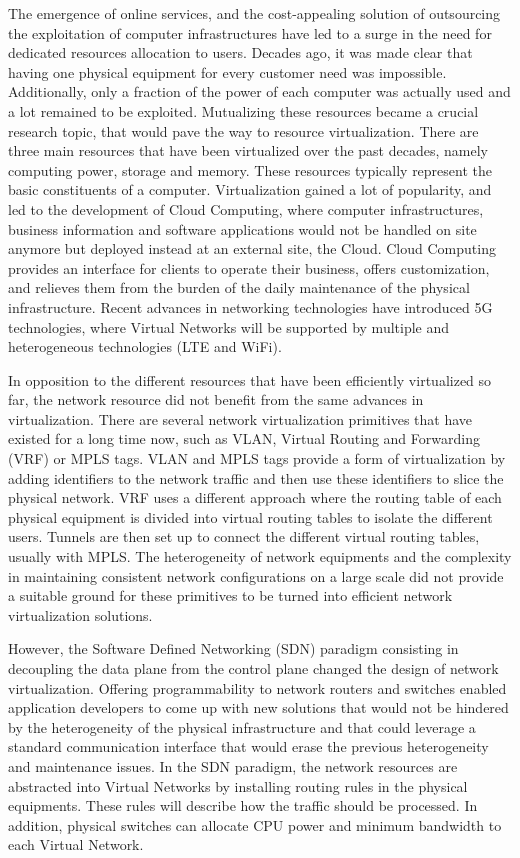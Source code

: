 The emergence of online services, and the cost-appealing solution of outsourcing the exploitation of computer infrastructures have led to a surge in the need for dedicated resources allocation to users. Decades ago, it was made clear that having one physical equipment for every customer need was impossible. Additionally, only a fraction of the power of each computer was actually used and a lot remained to be exploited.
Mutualizing these resources became a crucial research topic, that would pave the way to resource virtualization. 
There are three main resources that have been virtualized over the past decades, namely computing power, storage and memory.
These resources typically represent the basic constituents of a computer.
Virtualization gained a lot of popularity, and led to the development of Cloud Computing, where computer infrastructures, business information and software applications would not be handled on site anymore but deployed instead at an external site, \ie the Cloud.
Cloud Computing provides an interface for clients to operate their business, offers customization, and relieves them from the burden of the daily maintenance of the physical infrastructure. Recent advances in networking technologies have introduced 5G technologies, where Virtual Networks will be supported by multiple and heterogeneous technologies (\eg LTE and WiFi).

In opposition to the different resources that have been efficiently virtualized so far, the network resource did not benefit from the same advances in virtualization.
There are several network virtualization primitives that have existed for a long time now, such as VLAN, Virtual Routing and Forwarding (VRF) or MPLS tags. VLAN and MPLS tags provide a form of virtualization by adding identifiers to the network traffic and then use these identifiers to slice the physical network. VRF uses a different approach where the routing table of each physical equipment is divided into virtual routing tables to isolate the different users. Tunnels are then set up to connect the different virtual routing tables, usually with MPLS.
The heterogeneity of network equipments and the complexity in maintaining consistent network configurations on a large scale did not provide a suitable ground for these primitives to be turned into efficient network virtualization solutions.

However, the Software Defined Networking (SDN) paradigm consisting in decoupling the data plane from the control plane changed the design of network virtualization. Offering programmability to network routers and switches enabled application developers to come up with new solutions that would not be hindered by the heterogeneity of the physical infrastructure and that could leverage a standard communication interface that would erase the previous heterogeneity and maintenance issues.
In the SDN paradigm, the network resources are abstracted into Virtual Networks by installing routing rules in the physical equipments. These rules will describe how the traffic should be processed. In addition, physical switches can allocate CPU power and minimum bandwidth to each Virtual Network.


